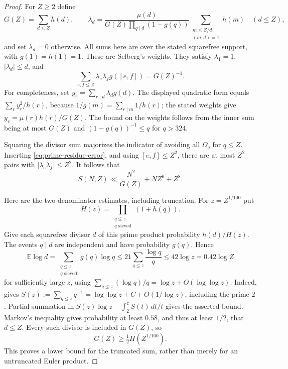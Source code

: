 \documentclass[11pt]{article}
\theoremstyle{definition}
\theoremstyle{remark}
\begin{document}
\begin{proof}
For $Z\ge2$ define
\[
 G(Z)=\sum_{d\le Z}h(d),\qquad
 \lambda_d=\frac{\mu(d)}{G(Z)\prod_{q\mid d}(1-g(q))}
       \sum_{\substack{m\le Z/d\\(m,d)=1}}h(m)
 \quad(d\le Z),
\]
and set $\lambda_d=0$ otherwise. All sums here are over the stated
squarefree support, with $g(1)=h(1)=1$. These are Selberg's weights.
They satisfy $\lambda_1=1$, $|\lambda_d|\le d$, and
\[
 \sum_{e,f\le Z}\lambda_e\lambda_f g([e,f])=G(Z)^{-1}.
\]
For completeness, set $y_r=\sum_{r\mid d}\lambda_dg(d)$.
The displayed quadratic form equals $\sum_r y_r^2/h(r)$,
because $1/g(m)=\sum_{r\mid m}1/h(r)$; the stated weights give
$y_r=\mu(r)h(r)/G(Z)$. The bound on the weights follows from
the inner sum being at most $G(Z)$ and
$(1-g(q))^{-1}\le q$ for $q>324$.

Squaring the divisor sum majorizes the indicator of avoiding
all $\Omega_q$ for $q\le Z$. Inserting
\eqref{eq:prime-residue-error}, and using $[e,f]\le Z^2$,
there are at most $Z^2$ pairs with $|\lambda_e\lambda_f|\le Z^2$.
It follows that
\begin{equation}\label{eq:prime-selberg}
 S(N,Z)\ll \frac{N^2}{G(Z)}+NZ^6+Z^8.
\end{equation}

Here are the two denominator estimates, including truncation.
For $z=Z^{1/100}$ put
\[
 H(z)=\prod_{\substack{q\le z\\q\text{ sieved}}}(1+h(q)).
\]
Give each squarefree divisor $d$ of this prime product probability
$h(d)/H(z)$. The events $q\mid d$ are independent and have
probability $g(q)$. Hence
\[
 \mathbb E\log d=\sum_{\substack{q\le z\\q\text{ sieved}}}
                  g(q)\log q
 \le21\sum_{q\le z}\frac{\log q}{q}
 \le42\log z=0.42\log Z
\]
for sufficiently large $z$, using
$\sum_{q\le z}(\log q)/q=\log z+O(\log\log z)$.
Indeed, \cite[Theorem 1, with modulus $2$]{williams-mertens}
gives $S(z):=\sum_{q\le z}q^{-1}
=\log\log z+C+O(1/\log z)$, including the prime $2$.
Partial summation in
$S(z)\log z-\int_2^z S(t)\,dt/t$ gives the asserted bound.
Markov's inequality gives probability at least $0.58$, and thus
at least $1/2$, that $d\le Z$. Every such divisor is included in
$G(Z)$, so
\begin{equation}\label{eq:prime-truncated-denominator}
 G(Z)\ge\tfrac12 H(Z^{1/100}).
\end{equation}
This proves a lower bound for the truncated sum, rather than
merely for an untruncated Euler product.


\end{proof}
\end{document}
